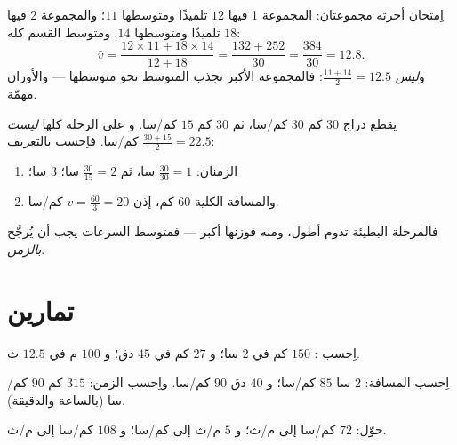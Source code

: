 \begin{example}\label{ex:g8:speed:average}
اِمتحان أجرته مجموعتان: المجموعة 1 فيها $12$ تلميذًا ومتوسطها
$11$؛ والمجموعة 2 فيها $18$ تلميذًا ومتوسطها $14$. ومتوسط القسم
كله:
\[
\bar v = \frac{12 \times 11 + 18 \times 14}{12 + 18}
= \frac{132 + 252}{30} = \frac{384}{30} = 12.8 .
\]
و\emph{ليس} $\frac{11 + 14}{2} = 12.5$: فالمجموعة الأكبر تجذب
المتوسط نحو متوسطها --- والأوزان مهمّة.
\end{example}

\begin{example}\label{ex:g8:speed:twolegs}
يقطع دراج $30$ كم  $30$ كم/سا، ثم $30$ كم  $15$ كم/سا. و
 على الرحلة كلها \emph{ليست}
$\frac{30 + 15}{2} = 22.5$ كم/سا. فاِحسب بالتعريف:
\begin{enumerate}
  \item الزمنان: $\frac{30}{30} = 1$ سا، ثم $\frac{30}{15} = 2$ سا؛
         $3$ سا؛
  \item والمسافة الكلية $60$ كم، إذن
        $v = \frac{60}{3} = 20$ كم/سا.
\end{enumerate}
فالمرحلة البطيئة تدوم أطول، ومنه فوزنها أكبر --- فمتوسط السرعات
يجب أن يُرجَّح \emph{بالزمن}.
\end{example}

\section{تمارين}

\begin{exercise}[$\star$]\label{exo:g8:speed:1}
اِحسب : $150$ كم في $2$ سا؛ و $27$ كم في $45$ دق؛
و $100$ م في $12.5$ ث.
\end{exercise}

\begin{exercise}[$\star$]\label{exo:g8:speed:2}
اِحسب المسافة: $2$ سا  $85$ كم/سا؛ و $40$ دق  $90$ كم/سا.
واِحسب الزمن: $315$ كم  $90$ كم/سا (بالساعة والدقيقة).
\end{exercise}

\begin{exercise}[$\star$]\label{exo:g8:speed:3}
حوّل: $72$ كم/سا إلى م/ث؛ و $5$ م/ث إلى كم/سا؛ و $108$ كم/سا إلى م/ث.
\end{exercise}

